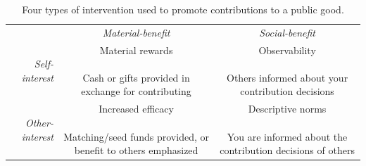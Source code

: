 \documentclass[conference]{IEEEtran}
\newcommand{\1}{\mathds{1}}
\newcommand{\myrotate}[1]{#1}
\newcommand{\PreserveBackslash}[1]{\let\temp=\\#1\let\\=\temp}
\newcommand{\mycell}[1]{\parbox[m]{1.1in}{\PreserveBackslash\raggedright \vspace{7pt} #1 \vspace{7pt}}}
\begin{document}
\begin{table}[h!tbp]
  \renewcommand{\arraystretch}{2}
  \caption{Four types of intervention used to promote contributions to a public good.}
  \label{tab:kraft-todd}
  \begin{tabular}{r|c|c|}

    \multicolumn{1}{c}{} & \multicolumn{1}{c}{\textit{Material-benefit}} & \multicolumn{1}{c}{\textit{Social-benefit}} \\
    \cline{2-3}

    \myrotate{\textit{Self-interest}} & \mycell{ Material rewards \\ \\ Cash or gifts provided in exchange for contributing } & \mycell{Observability \\ \\ Others informed about your contribution decisions} \\


    \myrotate{\textit{Other-interest}} & \mycell{ Increased efficacy \\ \\ Matching/seed funds provided, or benefit to others emphasized } & \mycell{Descriptive norms \\ \\ You are informed about the contribution decisions of others} \\

  \end{tabular}
\end{table}
\end{document}
